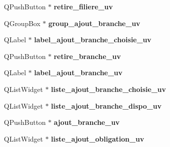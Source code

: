 \begin{DoxyCompactItemize}
\item 
\hypertarget{class_ui___administration_a8f82296781ac968e60be4a98dab16334}{Q\+Push\+Button $\ast$ {\bfseries retire\+\_\+filiere\+\_\+uv}}\label{class_ui___administration_a8f82296781ac968e60be4a98dab16334}

\item 
\hypertarget{class_ui___administration_a7498fe123cad3268ad369eb50bed1a51}{Q\+Group\+Box $\ast$ {\bfseries group\+\_\+ajout\+\_\+branche\+\_\+uv}}\label{class_ui___administration_a7498fe123cad3268ad369eb50bed1a51}

\item 
\hypertarget{class_ui___administration_a11a235085e4d44ee7a84f8a869f51607}{Q\+Label $\ast$ {\bfseries label\+\_\+ajout\+\_\+branche\+\_\+choisie\+\_\+uv}}\label{class_ui___administration_a11a235085e4d44ee7a84f8a869f51607}

\item 
\hypertarget{class_ui___administration_a318d1a6a6f1608dfcb18722194585c11}{Q\+Push\+Button $\ast$ {\bfseries retire\+\_\+branche\+\_\+uv}}\label{class_ui___administration_a318d1a6a6f1608dfcb18722194585c11}

\item 
\hypertarget{class_ui___administration_a934906684788d00e4c3e61b16e45ff50}{Q\+Label $\ast$ {\bfseries label\+\_\+ajout\+\_\+branche\+\_\+uv}}\label{class_ui___administration_a934906684788d00e4c3e61b16e45ff50}

\item 
\hypertarget{class_ui___administration_ac395971c96a0da33bfcd243227aff24a}{Q\+List\+Widget $\ast$ {\bfseries liste\+\_\+ajout\+\_\+branche\+\_\+choisie\+\_\+uv}}\label{class_ui___administration_ac395971c96a0da33bfcd243227aff24a}

\item 
\hypertarget{class_ui___administration_af3c0697ab9173302211796cf3962ef4f}{Q\+List\+Widget $\ast$ {\bfseries liste\+\_\+ajout\+\_\+branche\+\_\+dispo\+\_\+uv}}\label{class_ui___administration_af3c0697ab9173302211796cf3962ef4f}

\item 
\hypertarget{class_ui___administration_ae2b13c15e1e6e4e43b1d033105b7b720}{Q\+Push\+Button $\ast$ {\bfseries ajout\+\_\+branche\+\_\+uv}}\label{class_ui___administration_ae2b13c15e1e6e4e43b1d033105b7b720}

\item 
\hypertarget{class_ui___administration_a6fd0bcc04355555d97c3d44a0dc6a7c3}{Q\+List\+Widget $\ast$ {\bfseries liste\+\_\+ajout\+\_\+obligation\+\_\+uv}}\label{class_ui___administration_a6fd0bcc04355555d97c3d44a0dc6a7c3}


\end{DoxyCompactItemize}
